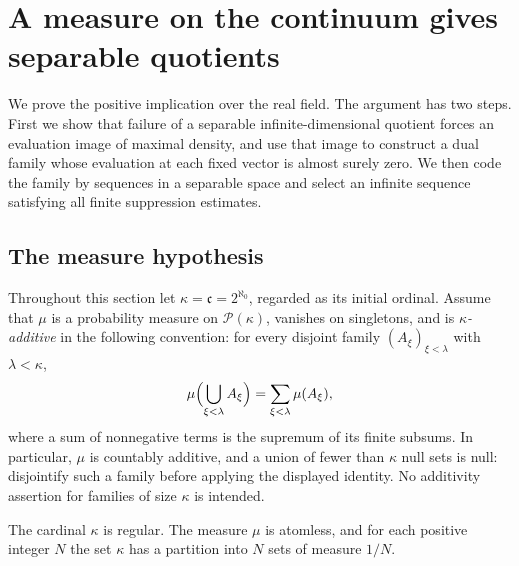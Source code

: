 \section{A measure on the continuum gives separable quotients}
\label{pos:section}\label{sec:positive}

We prove the positive implication over the real field.  The argument has two
steps. First we show that failure of a separable infinite-dimensional
quotient forces an evaluation image of maximal density, and use that image
to construct a dual family whose evaluation at each fixed vector is almost
surely zero. We then code the family by sequences in a separable space and
select an infinite sequence satisfying all finite suppression estimates.

\subsection{The measure hypothesis}

Throughout this section let $\kappa=\mathfrak c=2^{\aleph_0}$, regarded as its
initial ordinal.  Assume that $\mu$ is a probability measure on
$\mathcal P(\kappa)$, vanishes on singletons, and is \emph{$\kappa$-additive}
in the following convention: for every disjoint family $(A_\xi)_{\xi<\lambda}$
with $\lambda<\kappa$,
\[
 \mu\Bigl(\bigcup_{\xi<\lambda}A_\xi\Bigr)
   =\sum_{\xi<\lambda}\mu(A_\xi),
\]
where a sum of nonnegative terms is the supremum of its finite subsums.
In particular, $\mu$ is countably additive, and a union of fewer than
$\kappa$ null sets is null: disjointify such a family before applying the
displayed identity.  No additivity assertion for families of size
$\kappa$ is intended.

\begin{lemma}\label{pos:measure}
The cardinal $\kappa$ is regular.  The measure $\mu$ is atomless, and for
each positive integer $N$ the set $\kappa$ has a partition into $N$ sets
of measure $1/N$.
\end{lemma}

